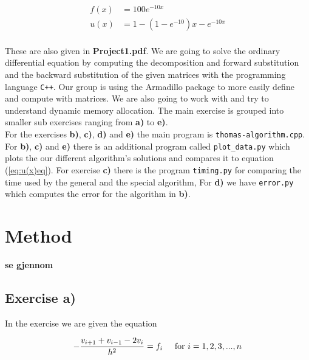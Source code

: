 \documentclass{article}
\begin{document}
\begin{align}
  f(x) &= 100 e ^{-10 x}    \label{eq:f(x)eq} \\
  u(x) &= 1 - (1- e ^{-10}) x - e ^{- 10 x} \label{eq:u(x)eq}
\end{align} \\

These are also given in \textbf{Project1.pdf}. We are going to solve the ordinary differential equation by computing the decomposition and forward substitution and the backward substitution of the given matrices with the programming language \texttt{C++}. Our group is using the Armadillo package to more easily define and compute with matrices. We are also going to work with and try to understand dynamic memory allocation. The main exercise is grouped into smaller sub exercises ranging from \textbf{a)} to \textbf{e)}. \\

For the exercises \textbf{b)}, \textbf{c)}, \textbf{d)} and \textbf{e)} the main program is \texttt{thomas-algorithm.cpp}. For \textbf{b)}, \textbf{c)} and \textbf{e)} there is an additional program called \texttt{plot\_data.py} which plots the our different algorithm's solutions and compares it to equation (\ref{eq:u(x)eq}). For exercise \textbf{c)} there is the program \texttt{timing.py} for comparing the time used by the general and the special algorithm, For \textbf{d)} we have \texttt{error.py} which computes the error for the algorithm in \textbf{b)}. \\


\vspace{1cm}

\section{Method} \label{Method}

  {\large \bf se gjennom} \\

\subsection{Exercise a)} \label{Method a)}

  In the exercise we are given the equation

  \begin{equation*}
    - \frac{v_{i+1} + v_{i-1} - 2 v_i}{h^2} = f_i \hspace{5mm} \textrm{for} ~  i = 1, 2, 3, ... , n
  \end{equation*}
\end{document}
